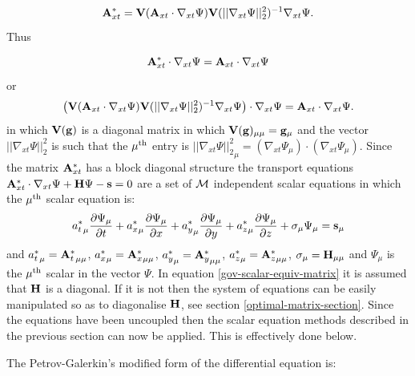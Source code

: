  
\begin{equation}
 {\bf A}_{xt}^* = {{\bf V}({\bf A}_{xt}\cdot{\nabla_{xt}} \Psi)}
 {\bf V}({\vert\vert{\nabla_{xt}} \Psi\vert\vert^2_2})^{-1} {\nabla_{xt}} \Psi. 
\label{a*-def-matrix} 
\end{equation}
 Thus 
 
\begin{equation}
 {\bf A}_{xt}^* \cdot {\nabla_{xt}} \Psi = {\bf A}_{xt} \cdot {\nabla_{xt}} \Psi 
\label{a*-equiv-matrix} 
\end{equation}
 or
\begin{equation}
 \left({{\bf V}({\bf A}_{xt}\cdot{\nabla_{xt}} \Psi)}
 {\bf V}({\vert\vert{\nabla_{xt}} \Psi\vert\vert^2_2})^{-1} {\nabla_{xt}} \Psi
    \right) \cdot {\nabla_{xt}} \Psi = {\bf A}_{xt} \cdot {\nabla_{xt}} \Psi . 
\label{equiv-matrix} 
\end{equation}
in which ${\bf V}({\bf g})$ is a diagonal matrix 
in which ${\bf V}({\bf g})_{\mu\mu}={\bf g}_\mu$ and the vector 
$\vert\vert{\nabla_{xt}} \Psi\vert\vert^2_2$ is such that the $\mu^{\rm th}$ 
entry is ${\vert\vert{\nabla_{xt}} \Psi\vert\vert^2_2}_\mu = (\nabla_{xt} \Psi_\mu)\cdot (\nabla_{xt} \Psi_\mu)$. 
Since the matrix ${\bf A}_{xt}^*$ has a block diagonal structure 
the transport equations 
${\bf A}_{xt}^*\cdot{\nabla_{xt}} \Psi+{\bf H}\Psi -{\bf s}=0$ 
are a set of ${\cal M}$ independent scalar equations 
in which the $\mu^{\rm th}$ scalar equation is: 
\begin{equation}
{a^*_t}_\mu \frac{\partial \Psi_\mu}{\partial t} + 
{a^*_x}_\mu \frac{\partial \Psi_\mu}{\partial x} + 
{a^*_y}_\mu \frac{\partial \Psi_\mu}{\partial y} + 
{a^*_z}_\mu \frac{\partial \Psi_\mu}{\partial z} + 
\sigma_\mu \Psi_\mu
={\bf s}_\mu
\label{gov-scalar-equiv-matrix} 
\end{equation}
and 
${a^*_t}_\mu={{\bf A}^*_t}_{\mu\mu}$, 
${a^*_x}_\mu={{\bf A}^*_x}_{\mu\mu}$, 
${a^*_y}_\mu={{\bf A}^*_y}_{\mu\mu}$, 
${a^*_z}_\mu={{\bf A}^*_z}_{\mu\mu}$, 
$\sigma_\mu={\bf H}_{\mu\mu}$ and $\Psi_\mu$ is the $\mu^{\rm th}$ scalar 
in the vector $\Psi$. In equation \ref{gov-scalar-equiv-matrix} it is 
assumed that ${\bf H}$ is a diagonal. If it is not then the system of 
equations can be easily manipulated so as to diagonalise ${\bf H}$, see 
section \ref{optimal-matrix-section}. Since the equations have been 
uncoupled then the scalar equation methods described in the 
previous section can now be applied. This is effectively done below. 
    
 The Petrov-Galerkin's modified form of the 
 differential equation is: 
 
